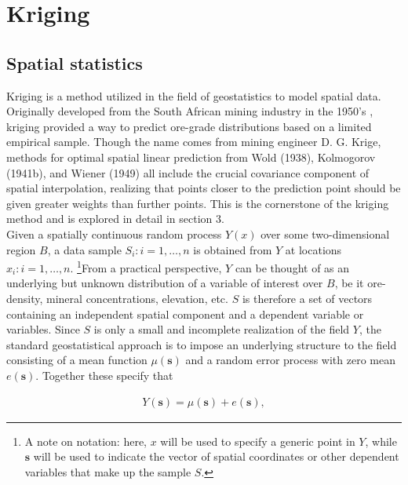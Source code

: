 \documentclass[12pt,twoside]{reedthesis}
\begin{document}
	
	
	
    \chapter{Kriging}
    	\section{Spatial statistics}
Kriging is a method utilized in the field of geostatistics to model spatial data. Originally developed from the South African mining industry in the 1950's \cite{cressie:1993}, kriging provided a way to predict ore-grade distributions based on a limited empirical sample. Though the name comes from mining engineer D. G. Krige, methods for optimal spatial linear prediction from Wold (1938), Kolmogorov (1941b), and Wiener (1949) all include the crucial covariance component of spatial interpolation, realizing that points closer to the prediction point should be given greater weights than further points. This is the cornerstone of the kriging method and is explored in detail in section 3. \\

Given a spatially continuous random process $Y(x)$ over some two-dimensional region $B$, a data sample $S_i: i=1, \dots, n$ is obtained from $Y$ at locations $x_i: i=1, \dots, n$. \footnote{A note on notation: here, $x$ will be used to specify a generic point in $Y$, while $\mathbf{s}$ will be used to indicate the vector of spatial coordinates or other dependent variables that make up the sample $S$.}From a practical perspective, $Y$ can be thought of as an underlying but unknown distribution of a variable of interest over $B$, be it ore-density, mineral concentrations, elevation, etc. $S$ is therefore a set of vectors containing an independent spatial component and a dependent variable or variables. Since $S$ is only a small and incomplete realization of the field $Y$, the standard geostatistical approach is to impose an underlying structure to the field consisting of a mean function $\mu(\mathbf{s})$ and a random error process with zero mean $e(\mathbf{s})$. Together these specify that 

\begin{align*}
Y(\mathbf{s}) = \mu(\mathbf{s}) + e(\mathbf{s}),
\end{align*}
\end{document}
